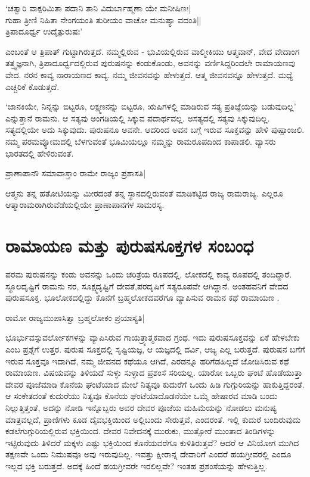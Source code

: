 \begin{shloka}
`ಚತ್ವಾರಿ ವಾಕ್ಪರಿಮಿತಾ ಪದಾನಿ ತಾನಿ ವಿದುರ್ಬಾಹ್ಮಣಾ ಯೇ ಮನೀಷಿಣಃ|\\
ಗುಹಾ ತ್ರೀಣಿ ನಿಹಿತಾ ನೇಂಗಯಂತಿ ತುರೀಯಂ ವಾಚೋ ಮನುಷ್ಯಾ ವದಂತಿ||\\
ತ್ರಿಪಾದೂರ್ಧ್ವ ಉದೈತ್ಪುರುಷಃ'\label{252a}
\end{shloka}

ಎಂಬಂತೆ ಆ ತ್ರಿಪಾತ್ ಗುಟ್ಟಾಗಿರುತ್ತದೆ. ನಮ್ಮಲ್ಲಿರುವ - ಭುವಿಯಲ್ಲಿರುವ ವಾಲ್ಮೀಕಿಯು ಆತ್ಮವಾನ್, ವೇದ ವೇದಾಂಗ ತತ್ತ್ವಜ್ಞನಾಗಿ, ತ್ರಿಪಾದೂರ್ಧ್ವದಲ್ಲಿರುವ ಪುರುಷನನ್ನು ಕಂಡುಕೊಂಡು, ಅವನನ್ನು ವರ್ಣಿಸಿದ್ದರಿಂದಲೇ ರಾಮಾಯಣವು ವೇದ. ನರನ ಕಾವ್ಯ ನಾರಾಯಣದ ಕಾವ್ಯ. ನಮ್ಮ ಜೀವನವನ್ನು ಹೇಳುತ್ತದೆ. ಆತ್ಮ ಜೀವನವನ್ನೂ ಹೇಳುತ್ತದೆ. ಮಧ್ಯೆ ಎಚ್ಚರಿಕೆ ಕೊಡುತ್ತದೆ. 

`ಜಾನಕಿಯೇ, ನಿನ್ನನ್ನು ಬಿಟ್ಟರೂ, ಲಕ್ಷ್ಮಣನನ್ನು ಬಿಟ್ಟರೂ, ಋಷಿಗಳಲ್ಲಿ ಮಾಡಿರುವ ಸತ್ಯ ಪ್ರತಿಜ್ಞೆಯನ್ನು  ಬಡುವುದಿಲ್ಲ' ಎನ್ನುತ್ತಾನೆ ರಾಮನು. ಆ ಸತ್ಯವು ಅಂಗಡಿಯಲ್ಲಿ ಸಿಕ್ಕುವ ಪದಾರ್ಥವಲ್ಲ. ಅಸತ್ಯದಲ್ಲಿ ಸತ್ಯವು ಸಿಕ್ಕುವುದಿಲ್ಲ. ಸತ್ಯದಲ್ಲಿಯೇ ಅದು ಸಿಕ್ಕುವುದು. ಪುರುಷನೂ ಅವನೇ. ಆದರಿಂದ ಅವನ ಬಗ್ಗೆ ಇರುವ ಸೂಕ್ತವನ್ನು ಹೇಳಿ ಪುಷ್ಪಾಂಜಲಿ. ನಮ್ಮ ಪರಮವ್ಯೋಮದಲ್ಲಿ ಬೆಳಗುವಂತೆ ಭೂಮಿಯಲ್ಲೂ ನಮ್ಮನ್ನು ರಾಮರೂಪದಿಂದ ಕಾಪಾಡಲಿ. ವ್ಯಾಸರು ಭಾರತದಲ್ಲಿ ಹೇಳಿರುವಂತೆ.

\begin{shloka}
ಪ್ರಾಣಾಪಾನೌ ಸಮಾವಾಸ್ತಾಂ ರಾಮೇ ರಾಜ್ಯಂ ಪ್ರಶಾಸತಿ|\label{253}
\end{shloka}

ಆತ್ಮನು ತನ್ನ ಹತೋಟಿಯನ್ನು ಮೀರದಂತೆ ತನ್ನ ಸ್ಥಾನದಲ್ಲಿರುವಂತೆ ಮಾಡಿಕಟ್ಟಿದ ರಾಜ್ಯ ರಾಮರಾಜ್ಯ. ಎಲ್ಲರೂ ಆತ್ಮಾರಾಮರಾಗಿರುವೆಡೆಯಲ್ಲಿಯೇ ಪ್ರಾಣಾಪಾನಗಳ ಸಾಮರಸ್ಯ. 

\section*{ರಾಮಾಯಣ ಮತ್ತು ಪುರುಷಸೂಕ್ತಗಳ ಸಂಬಂಧ}

ಪರಮ ಪುರುಷನನ್ನು ಕಂಡು ಅವನನ್ನು ಒಂದು ಚರಿತ್ರೆಯ ರೂಪದಲ್ಲಿ, ಲೋಕದಲ್ಲಿ ಕಾವ್ಯ ರೂಪದಲ್ಲಿ ತಂದಿದ್ದಾರೆ. ಸ್ಥೂಲದೃಷ್ಟಿಗೆ ರಾಮನು ನರ, ಸೂಕ್ಷ್ಮದೃಷ್ಟಿಗೆ ದೇವತೆ,ಪರದೃಷಿಗೆ ಸತ್ಯರೂಪವೇ ಆಗಿದ್ದಾನೆ. ಅಂತಹವನಿಗೆ ವೇದದ ಪುರುಷಸೂಕ್ತ. ಭೂಲೋಕದಲ್ಲಿದ್ದು ಕೊನೆಗೆ ಬ್ರಹ್ಮಲೋಕದವರೆಗೂ ವ್ಯಾಪಿಸುವ ರಾಮನ ಕಥೆ ರಾಮಾಯಣ . 

\begin{shloka}
ರಾಮೋ ರಾಜ್ಯಮುಪಾಸಿತ್ವಾ ಬ್ರಹ್ಮಲೋಕಂ ಪ್ರಯಾಸ್ಯತಿ|\label{253a}
\end{shloka}

ಭೂರ್ಭುವಸ್ಸುವರ್ಲೋಕಗಳನ್ನು ವ್ಯಾಪಿಸಿರುವ ಗಾಯತ್ರ್ಯಾತ್ಮಕವಾದ ಗ್ರಂಥ. ಇದು ಪುರುಷಸೂಕ್ತವನ್ನು ಏಕೆ ಹೇಳಬೇಕು ಎಂಬ ಪ್ರಶ್ನೆಗೆ ಉತ್ತರ. ಪುರುಷ ಸೂಕ್ತದಲ್ಲಿ ಸೃಷ್ಟಿಯಜ್ಞ, ಆ ಯಜ್ಞದಲ್ಲಿ ದರ್ವಿ, ಆಜ್ಯ ಎಲ್ಲ ಬರುತ್ತದೆ. ಪುರುಷನ ಬಗೆಗೆ ಇರುವ ಸೂಕ್ತವೂ ಇದಾಗಿದೆ, ನಮ್ಮ ಜೀವನದ ಕಥೆಯೂ ಆಗಿದೆ, ಎರಡನ್ನೂ ಹರಿಗೆಡಹಿಲ್ಲದೆ ಜೋಡಿಸಿರುವ ಕಥೆ ರಾಮಾಯಣ. ವಿಷಯವನ್ನು ತಿಳಿಯದೆ ಸುಳ್ಳು ಸುಳ್ಳಾದ ಪ್ರಶಂಸೆ ಸರಿಯಲ್ಲ. ಯಾರೋ ಒಬ್ಬರು ಘಂಟೆ ಹೊಡೆಯುತ್ತಾ ದೇವರ ಪೂಜೆಮಾಡಿ ಕೊನೆಯ ಘಂಟೆಯಾದ ಮೇಲೆ ನಿತ್ಯವೂ ಕುದುರೆಗೆ ಒಂದು ಹಿಡಿ ಗುಗ್ಗುರಿಯನ್ನು ಹಾಕುತ್ತಿದ್ದರಂತೆ. ಆ ಸಂಕೇತದಂತೆ ಕುದುರೆಯು ನಿತ್ಯವೂ ಕೊನೆಯ ಘಂಟೆಯಾದೊಡನೆಯೇ ಒಮ್ಮೆ ಹೇಷಾರವ ಮಾಡಿ ಬಂದು ನಿಲ್ಲುತ್ತಿತ್ತಂತೆ, ಅದನ್ನು ನೋಡಿ ಇನ್ನೊಬ್ಬರು ಅವರ ದೇವರ ಪೂಜೆಯ ಮಹಿಮೆಯನ್ನು ನೋಡಲು ಮನುಷ್ಯ ಮಾತ್ರವಲ್ಲದೆ, ಪ್ರಾಣಿಗಳು ಕೂಡ ದೈವಭಕ್ತಿಯಿಂದ ಅಲ್ಲಿಬಂದು ಸೇರುತ್ತವೆ, ಎಂದರಂತೆ. ಇಲ್ಲಿ ಕುದುರೆ ಬಂದಿರುವುದು ಕಡಲೆಗುಗ್ಗುರಿಯಲ್ಲಿರುವ ಭಕ್ತಿಯಿಂದ. ದೇವರ ನಿವೇದನಕ್ಕೆ ಮುರುಕು, ಮುತ್ಸೋರೆ ಮುಂತಾದ ತಿಂಡಿಗಳನ್ನು ಇಟ್ಟಿರುವುದು ತಿಳಿದರೆ ಮಕ್ಕಳು ಎಷ್ಟು ಭಕ್ತಿಯಿಂದ ಕೊನೆಯವರೆಗೂ ಕುಳಿತಿರುತ್ತವೆ? ಆದರೆ ಆ ವಿನಿಯೋಗ ಮುಗಿದ ತಕ್ಷಣವೇ ಒಂದು ನಿಮುಷವೂ ಅವು ಇರುವುದಿಲ್ಲ. ಇವತ್ತು ಕ್ಷೀರಾನ್ನ ದೇವಾರಿಗೆ ಎಂದರೆ ಹಯಗ್ರೀವರಲ್ಲಿ ಎಂದೂ ಇಲ್ಲದ ಭಕ್ತಿ ಬರುತ್ತದೆ. ಅದಕ್ಕೆ ಹಿಂದೆ ಹಯಗ್ರೀವರೇ ಇರಲಿಲ್ಲವೇ? ಇಂತಹ ಪ್ರಶಂಸೆಯನ್ನು ಹೇಳುತ್ತಿಲ್ಲ. 

